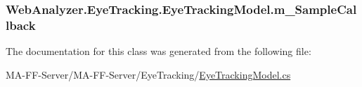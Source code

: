 \subsubsection[{m\+\_\+\+Sample\+Callback}]{ Web\+Analyzer.\+Eye\+Tracking.\+Eye\+Tracking\+Model.\+m\+\_\+\+Sample\+Callback\hspace{0.3cm}{\ttfamily [private]}}\label{class_web_analyzer_1_1_eye_tracking_1_1_eye_tracking_model_a968cb8269069b117054c23c913671380}


The documentation for this class was generated from the following file\+:\begin{DoxyCompactItemize}
\item 
M\+A-\/\+F\+F-\/\+Server/\+M\+A-\/\+F\+F-\/\+Server/\+Eye\+Tracking/\hyperlink{_eye_tracking_model_8cs}{Eye\+Tracking\+Model.\+cs}\end{DoxyCompactItemize}

